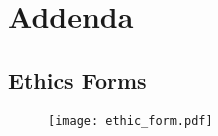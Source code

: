 \chapter{Addenda}

\section{Ethics Forms}
\begin{figure}[ht]
	\centering
	\texttt{[image: ethic\_form.pdf]}
\end{figure}